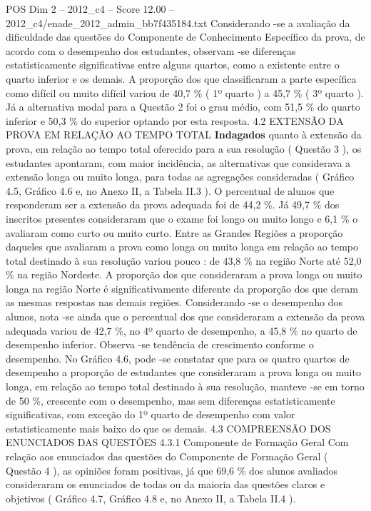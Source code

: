 \begin{textsample}{POS Dim 2 – 2012\_c4 – Score 12.00 – 2012\_c4/enade\_2012\_admin\_bb7f435184.txt}
Considerando -se a avaliação da dificuldade das questões do Componente de Conhecimento Específico da prova, de acordo com o desempenho dos estudantes, observam -se diferenças estatisticamente significativas entre alguns quartos, como a existente entre o quarto inferior e os demais.
A proporção dos que classificaram a parte específica como difícil ou muito difícil variou de 40,7 \% ( 1º quarto ) a 45,7 \% ( 3º quarto ).
Já a alternativa modal para a Questão 2 foi o grau médio, com 51,5 \% do quarto inferior e 50,3 \% do superior optando por esta resposta. 4.2 EXTENSÃO DA PROVA EM RELAÇÃO AO TEMPO TOTAL \textbf{Indagados} quanto à extensão da prova, em relação ao tempo total oferecido para a sua resolução ( Questão 3 ), os estudantes apontaram, com maior incidência, as alternativas que considerava a extensão longa ou muito longa, para todas as agregações consideradas ( Gráfico 4.5, Gráfico 4.6 e, no Anexo II, a Tabela II.3 ).
O percentual de alunos que responderam ser a extensão da prova adequada foi de 44,2 \%.
Já 49,7 \% dos inscritos presentes consideraram que o exame foi longo ou muito longo e 6,1 \% o avaliaram como curto ou muito curto.
Entre as Grandes Regiões a proporção daqueles que avaliaram a prova como longa ou muito longa em relação ao tempo total destinado à sua resolução variou pouco : de 43,8 \% na região Norte até 52,0 \% na região Nordeste.
A proporção dos que consideraram a prova longa ou muito longa na região Norte é significativamente diferente da proporção dos que deram as mesmas respostas nas demais regiões.
Considerando -se o desempenho dos alunos, nota -se ainda que o percentual dos que consideraram a extensão da prova adequada variou de 42,7 \%, no 4º quarto de desempenho, a 45,8 \% no quarto de desempenho inferior.
Observa -se tendência de crescimento conforme o desempenho.
No Gráfico 4.6, pode -se constatar que para os quatro quartos de desempenho a proporção de estudantes que consideraram a prova longa ou muito longa, em relação ao tempo total destinado à sua resolução, manteve -se em torno de 50 \%, crescente com o desempenho, mas sem diferenças estatisticamente significativas, com exceção do 1º quarto de desempenho com valor estatisticamente mais baixo do que os demais. 4.3 COMPREENSÃO DOS ENUNCIADOS DAS QUESTÕES 4.3.1 Componente de Formação Geral Com relação aos enunciados das questões do Componente de Formação Geral ( Questão 4 ), as opiniões foram positivas, já que 69,6 \% dos alunos avaliados consideraram os enunciados de todas ou da maioria das questões claros e objetivos ( Gráfico 4.7, Gráfico 4.8 e, no Anexo II, a Tabela II.4 ).

\end{textsample}
